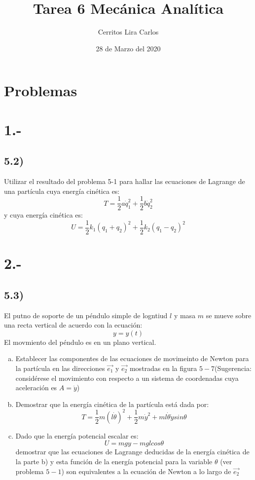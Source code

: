\documentclass{article}
\title{Tarea 6 Mecánica Analítica}
\author{Cerritos Lira Carlos}
\date{28 de Marzo del 2020}
\begin{document}
\maketitle
\section*{Problemas}
\section*{1.-}
\subsection*{5.2)}
Utilizar el resultado del problema 5-1 para hallar las ecuaciones de
Lagrange de una partícula cuya energía cinética es:
\[ T = \frac{1}{2}a\dot{q}_1^2+\frac{1}{2}b\dot{q}_2^2 \]
y cuya energía cinética es:
\[ U = \frac{1}{2}k_1(q_1+q_2)^2+\frac{1}{2}k_2(q_1-q_2)^2 \]
\begin{tcolorbox}[breakable]
\end{tcolorbox}

\section*{2.-}
\subsection*{5.3)}
El putno de soporte de un péndulo simple de logntiud $l$ y masa $m$ se mueve sobre 
una recta vertical de acuerdo con la ecuación:
\[y= y(t)\]
El movmiento del péndulo es en un plano vertical.
\begin{enumerate}[a)]
    \item Establecer las componentes de las ecuaciones de movimeinto de Newton 
    para la partícula en las direcciones $\vec{e_1}$ y $\vec{e_2}$ mostradas en
    la figura $5-7$(Sugerencia: considérese el movimiento con respecto a un sistema
    de coordenadas cuya aceleración es $A=\ddot{y}$)
    \item Demostrar que la energía cinética de la partícula está dada por:
    \[ T = \frac{1}{2}m(l\dot{\theta})^2 + \frac{1}{2}m\dot{y}^2 + ml\dot{\theta}\dot{y}sin\theta \]
    \item Dado que la energía potencial escalar es:
    \[ U = mgy - mglcos\theta \]
    demostrar que las ecuaciones de Lagrange deducidas de la energía cinética de la 
    parte b) y esta función de la energía potencial para la variable $\theta$
    (ver problema $5-1$) son equivalentes a la ecuación de Newton a lo largo de $\vec{e_2}$
\end{enumerate}
\begin{tcolorbox}[breakable]
\end{tcolorbox}
\end{document}
